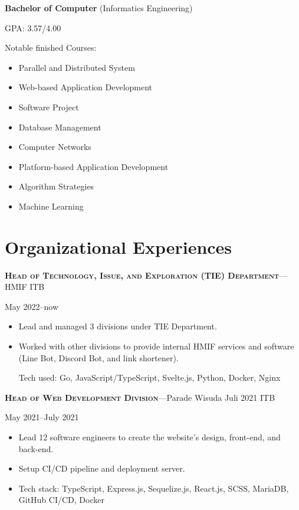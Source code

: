 \documentclass[10pt]{article}
\newcommand{\workExpVspace}{1em}
\newcommand{\orgExp}[5]{
    \noindent \textbf{\textsc{#1}}---#2

    {#3}--{#4}

    {#5}
    \vspace{\workExpVspace}
}
\begin{document}
\textbf{Bachelor of Computer} (Informatics Engineering)

GPA: 3.57/4.00

Notable finished Courses:
\begin{multicols}{2}
    \begin{itemize}
        \item Parallel and Distributed System
        \item Web-based Application Development
        \item Software Project
        \item Database Management
        \item Computer Networks
        \item Platform-based Application Development
        \item Algorithm Strategies
        \item Machine Learning
    \end{itemize}
\end{multicols}

\section{Organizational Experiences}

\orgExp
    {Head of Technology, Issue, and Exploration (TIE) Department}
    {HMIF ITB}
    {May 2022}
    {now}
    {
        \begin{itemize}
            \item Lead and managed 3 divisions under TIE Department.
            \item Worked with other divisions to provide internal HMIF services and software (Line
                Bot, Discord Bot, and link shortener).

                Tech used: Go, JavaScript/TypeScript, Svelte.js, Python, Docker, Nginx
        \end{itemize}
    }
    
\orgExp
{Head of Web Development Division}
{Parade Wisuda Juli 2021 ITB}
{May 2021}
{July 2021}
{
    \begin{itemize}
        \item Lead 12 software engineers to create the website's design, front-end, and back-end.
        \item Setup CI/CD pipeline and deployment server.
        \item Tech stack: TypeScript, Express.js, Sequelize.js, React.js, SCSS, MariaDB, GitHub
            CI/CD, Docker
    \end{itemize}
}
\end{document}
